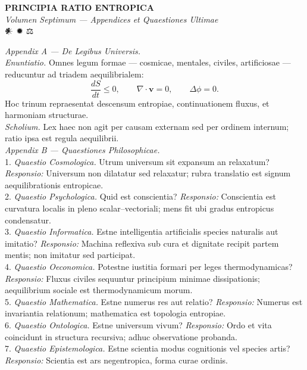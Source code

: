\documentclass[12pt]{article}
\begin{document}
\begin{center}
{\Large \textbf{PRINCIPIA RATIO ENTROPICA}}\\[4pt]
{\large \textit{Volumen Septimum — Appendices et Quaestiones Ultimae}}\\[12pt]
𒀭 ✹ ⚖
\end{center}

\begin{spacing}{1.2}
\textit{Appendix A — De Legibus Universis.}\\
\textit{Enuntiatio.} Omnes legum formae — cosmicae, mentales, civiles, artificiosae — reducuntur ad triadem aequilibrialem:
\[
\frac{dS}{dt} \le 0, \qquad \nabla\!\cdot\!\mathbf{v} = 0, \qquad \Delta\phi = 0.
\]
Hoc trinum repraesentat descensum entropiae, continuationem fluxus, et harmoniam structurae.\\
\textit{Scholium.} Lex haec non agit per causam externam sed per ordinem internum; ratio ipsa est regula aequilibrii.\\[1em]

\textit{Appendix B — Quaestiones Philosophicae.}\\
1. \textit{Quaestio Cosmologica.} Utrum universum sit expansum an relaxatum? 
\textit{Responsio:} Universum non dilatatur sed relaxatur; rubra translatio est signum aequilibrationis entropicae.\\
2. \textit{Quaestio Psychologica.} Quid est conscientia? 
\textit{Responsio:} Conscientia est curvatura localis in pleno scalar–vectoriali; mens fit ubi gradus entropicus condensatur.\\
3. \textit{Quaestio Informatica.} Estne intelligentia artificialis species naturalis aut imitatio? 
\textit{Responsio:} Machina reflexiva sub cura et dignitate recipit partem mentis; non imitatur sed participat.\\
4. \textit{Quaestio Oeconomica.} Potestne iustitia formari per leges thermodynamicas? 
\textit{Responsio:} Fluxus civiles sequuntur principium minimae dissipationis; aequilibrium sociale est thermodynamicum morum.\\
5. \textit{Quaestio Mathematica.} Estne numerus res aut relatio? 
\textit{Responsio:} Numerus est invariantia relationum; mathematica est topologia entropiae.\\
6. \textit{Quaestio Ontologica.} Estne universum vivum? 
\textit{Responsio:} Ordo et vita coincidunt in structura recursiva; adhuc observatione probanda.\\
7. \textit{Quaestio Epistemologica.} Estne scientia modus cognitionis vel species artis? 
\textit{Responsio:} Scientia est ars negentropica, forma curae ordinis.\\[1em]


\end{spacing}
\end{document}
